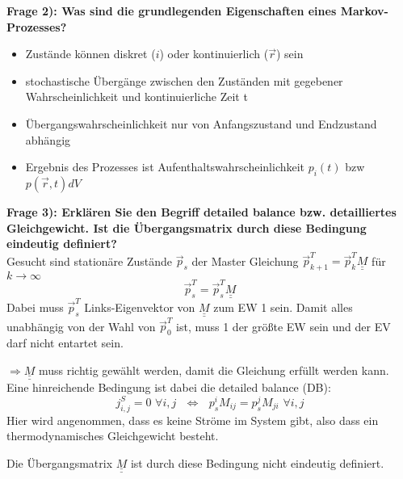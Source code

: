 \newpage
\textbf{Frage 2): Was sind die grundlegenden Eigenschaften eines Markov-Prozesses?}\\

  \begin{itemize}
    \item Zustände können diskret ($i$) oder kontinuierlich ($\vec{r}$) sein
    \item stochastische Übergänge zwischen den Zuständen mit gegebener Wahrscheinlichkeit und kontinuierliche Zeit t
    \item Übergangswahrscheinlichkeit nur von Anfangszustand und Endzustand abhängig
    \item Ergebnis des Prozesses ist Aufenthaltswahrscheinlichkeit $p_i(t)$ bzw $p(\vec{r},t)dV$
  \end{itemize}

\textbf{Frage 3): Erklären Sie den Begriff detailed balance bzw. detailliertes Gleichgewicht.
Ist die Übergangsmatrix durch diese Bedingung eindeutig definiert?}\\

  Gesucht sind stationäre Zustände $\vec{p}_{s}$ der Master Gleichung
  $\vec{p}^T_{k+1} = \vec{p}^T_k \underline{\underline{M}}$ für $k \rightarrow \infty$
  \begin{equation*}
    \vec{p}^T_{s} = \vec{p}^T_s \underline{\underline{M}}
  \end{equation*}
  Dabei muss $\vec{p}^T_{s}$ Links-Eigenvektor von $\underline{\underline{M}}$
  zum EW 1 sein. Damit alles unabhängig von der Wahl von $\vec{p}^T_0$ ist, muss
  1 der größte EW sein und der EV darf nicht entartet sein.

  $\Rightarrow \underline{\underline{M}}$ muss richtig gewählt werden, damit die Gleichung erfüllt
  werden kann.
  Eine hinreichende Bedingung ist dabei die detailed balance (DB):
  \begin{equation*}
    j^S_{i,j}=0\,\, \forall i,j \,\,\,\,\Leftrightarrow \,\,\,\, p_s^i M_{ij} = p_s^j M_{ji} \,\,\forall i,j
  \end{equation*}
  Hier wird angenommen, dass es keine Ströme im System gibt, also dass ein
  thermodynamisches Gleichgewicht besteht.

  Die Übergangsmatrix $\underline{\underline{M}}$ ist durch diese Bedingung nicht
  eindeutig definiert.

